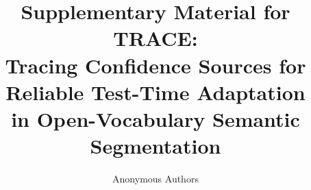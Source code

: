 \documentclass[letterpaper]{article}
\title{Supplementary Material for TRACE:\\Tracing Confidence Sources for Reliable Test-Time Adaptation\\in Open-Vocabulary Semantic Segmentation}
\author{Anonymous Authors}
\begin{document}
\raggedbottom
\maketitle
\appendix

\end{document}
